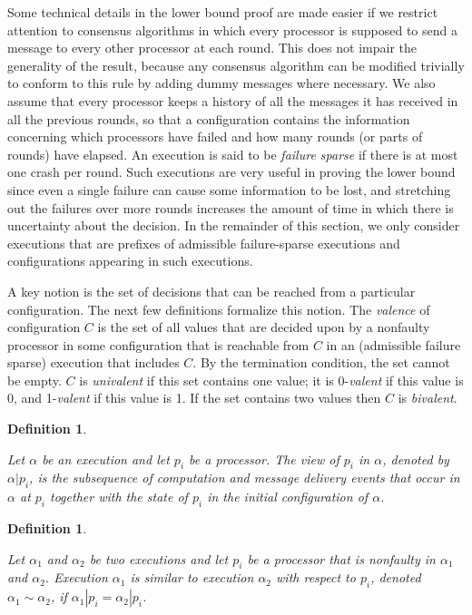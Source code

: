 \documentclass{article}
\newtheorem{defn}[thm]{Definition}
\newenvironment{definition}{\begin{defn}\begin{em}}%
{\end{em}\end{defn}}
\begin{document}
Some technical details in the lower bound proof are made easier if we restrict attention to consensus algorithms in which every processor is supposed to send a message to every other processor at each round. This does not impair the generality of the result, because any consensus algorithm can be modified trivially to conform to this rule by adding dummy messages where necessary. We also assume that every processor keeps a history of all the messages it has received in all the previous rounds, so that a configuration contains the information concerning which processors have failed and how many rounds (or parts of rounds) have elapsed. An execution is said to be \textit{failure sparse} if there is at most one crash per round. Such executions are very useful in proving the lower bound since even a single failure can cause some information to be lost, and stretching out the failures over more rounds increases the amount of time in which there is uncertainty about the decision. In the remainder of this section, we only consider executions that are prefixes of admissible failure-sparse executions and configurations appearing in such executions.

A key notion is the set of decisions that can be reached from a particular configuration. The next few definitions formalize this notion. The \textit{valence} of configuration $C$ is the set of all values that are decided upon by a nonfaulty processor in some configuration that is reachable from $C$ in an (admissible failure sparse) execution that includes $C$. By the termination condition, the set cannot be empty. $C$ is \textit{univalent} if this set contains one value; it is 0-\textit{valent} if this value is 0, and 1-\textit{valent} if this value is 1. If the set contains two values then $C$ is \textit{bivalent}. 

\begin{definition} Let $\alpha$ be an execution and let $p_i$ be a processor. The \textit{view} of $p_i$ in $\alpha$, denoted by $\alpha|p_i$, is the subsequence of computation and message delivery events that occur in $\alpha$ at $p_i$ together with the state of $p_i$ in the initial configuration of $\alpha$. 
\end{definition} 
\begin{definition}Let $\alpha_1$ and $\alpha_2$ be two executions and let $p_i$ be a processor that is nonfaulty in $\alpha_1$ and $\alpha_2$. Execution $\alpha_1$ is similar to execution $\alpha_2$ with respect to $p_i$, denoted $\alpha_1 \sim \alpha_2$, if $\alpha_1|p_i = \alpha_2 |p_i$. 
\end{definition}
\end{document}

